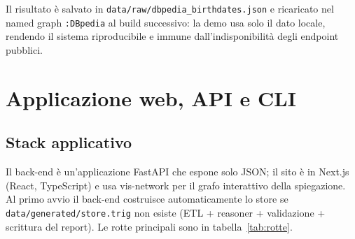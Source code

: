 \documentclass[a4paper,11pt]{article}
\newcommand{\code}[1]{\texttt{#1}}
\begin{document}
Il risultato \`e salvato in \code{data/raw/dbpedia\_birthdates.json} e
ricaricato nel named graph \code{:DBpedia} al build successivo: la demo
usa solo il dato locale, rendendo il sistema riproducibile e immune
dall'indisponibilit\`a degli endpoint pubblici.

\section{Applicazione web, API e CLI}\label{sec:web}

\subsection{Stack applicativo}

Il back-end \`e un'applicazione FastAPI che espone solo JSON; il sito \`e in Next.js
(React, TypeScript) e usa vis-network per il grafo interattivo della spiegazione.
Al primo avvio il back-end costruisce automaticamente lo store se
\code{data/generated/store.trig} non esiste (ETL + reasoner + validazione
+ scrittura del report). Le rotte principali sono in
tabella~\ref{tab:rotte}.
\end{document}
